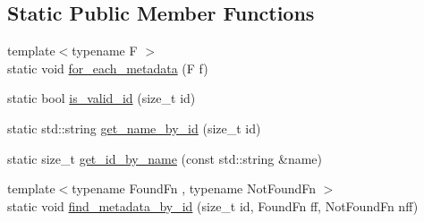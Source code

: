 \subsection*{Static Public Member Functions}
\begin{DoxyCompactItemize}
\item 
{\footnotesize template$<$typename F $>$ }\\static void \mbox{\hyperlink{classxd_1_1reg_1_1___register_context_3_01__base_00_01_register__t_00_01_registers__t_8_8_8_01_4_a3182cab25720d0774a5effcae94e93e4}{for\+\_\+each\+\_\+metadata}} (F f)
\item 
static bool \mbox{\hyperlink{classxd_1_1reg_1_1___register_context_3_01__base_00_01_register__t_00_01_registers__t_8_8_8_01_4_a45503882ea5a391bc3cefd1123654788}{is\+\_\+valid\+\_\+id}} (size\+\_\+t id)
\item 
static std\+::string \mbox{\hyperlink{classxd_1_1reg_1_1___register_context_3_01__base_00_01_register__t_00_01_registers__t_8_8_8_01_4_a71ba8b071e7044d01503623bd87fd1e0}{get\+\_\+name\+\_\+by\+\_\+id}} (size\+\_\+t id)
\item 
static size\+\_\+t \mbox{\hyperlink{classxd_1_1reg_1_1___register_context_3_01__base_00_01_register__t_00_01_registers__t_8_8_8_01_4_a1f4b914ec5a811b7ca21cb580446233b}{get\+\_\+id\+\_\+by\+\_\+name}} (const std\+::string \&name)
\item 
{\footnotesize template$<$typename Found\+Fn , typename Not\+Found\+Fn $>$ }\\static void \mbox{\hyperlink{classxd_1_1reg_1_1___register_context_3_01__base_00_01_register__t_00_01_registers__t_8_8_8_01_4_af0bbfac6c6abafcf8fb154ffd4be6ed0}{find\+\_\+metadata\+\_\+by\+\_\+id}} (size\+\_\+t id, Found\+Fn ff, Not\+Found\+Fn nff)
\end{DoxyCompactItemize}
